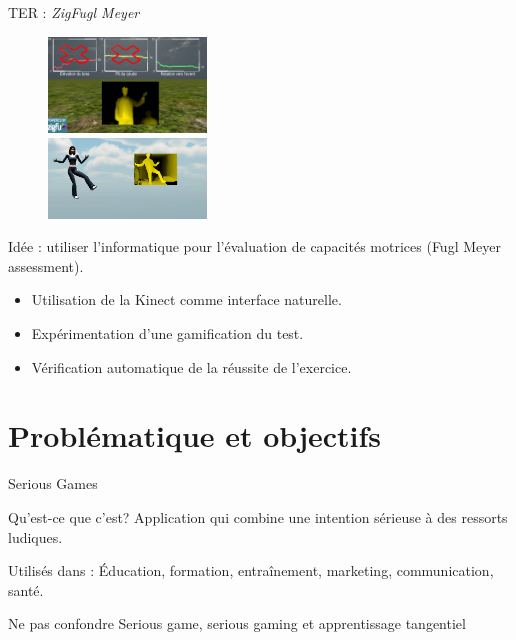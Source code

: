 \documentclass{beamer}
\begin{document}
		
		\begin{frame}{TER : \emph{ZigFugl Meyer}}
			\begin{minipage}{0.40\linewidth}
				\begin{figure}
					\includegraphics[width=4.2cm]{../images/zigfugl-meyer_1.png}\\
					\includegraphics[width=4.2cm]{../images/zigfugl-meyer_2.png}
				\end{figure}
			\end{minipage}
			\begin{minipage}{6cm}%
				Idée : utiliser l'informatique pour l'évaluation de capacités motrices (Fugl Meyer assessment). 
					\begin{itemize}
						\item Utilisation de la Kinect comme interface naturelle.
						\item Expérimentation d'une gamification du test.
						\item Vérification automatique de la réussite de l'exercice.
					\end{itemize}
			\end{minipage}
		\end{frame}
	
	\section{Problématique et objectifs}
		\begin{frame}{Serious Games}
			\begin{block}{Qu'est-ce que c'est?}
				Application qui combine une intention sérieuse à des ressorts ludiques.
			\end{block}
			\begin{exampleblock}{Utilisés dans :}
				Éducation, formation, entraînement, marketing, communication, santé.
			\end{exampleblock}	
			\begin{alertblock}{Ne pas confondre}
				Serious game, serious gaming et apprentissage tangentiel
			\end{alertblock}
		\end{frame}
	
\end{document}
